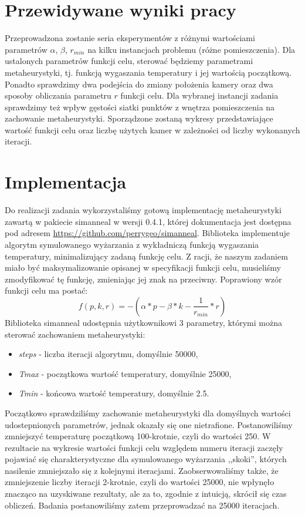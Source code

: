 \documentclass[12pt,a4paper]{article}
\begin{document}
\section{Przewidywane wyniki pracy}
Przeprowadzona zostanie seria eksperymentów z różnymi wartościami parametrów $\alpha$, $\beta$, $r_{min}$ na kilku instancjach problemu (różne pomieszczenia). Dla ustalonych parametrów funkcji celu, sterować będziemy parametrami metaheurystyki, tj. funkcją wygaszania temperatury i jej
wartością początkową. Ponadto sprawdzimy dwa podejścia do zmiany położenia kamery oraz dwa sposoby obliczania parametru $r$ funkcji celu. Dla wybranej
instancji zadania sprawdzimy też wpływ gęstości siatki punktów z wnętrza
pomieszczenia na zachowanie metaheurystyki. Sporządzone zostaną wykresy przedstawiające wartość funkcji celu oraz liczbę użytych kamer w zależności od liczby wykonanych iteracji. 

\section{Implementacja}
Do realizacji zadania wykorzystaliśmy gotową implementację metaheurystyki zawartą w pakiecie simanneal w wersji 0.4.1,
której dokumentacja jest dostępna pod adresem \url{https://github.com/perrygeo/simanneal}.
Biblioteka implementuje algorytm symulowanego wyżarzania z wykładniczą funkcją wygaszania temperatury, minimalizujący zadaną
funkcję celu. Z racji, że naszym zadaniem miało być maksymalizowanie opisanej w specyfikacji funkcji celu, musieliśmy zmodyfikować tę
funkcję, zmieniając jej znak na przeciwny. Poprawiony wzór funkcji celu ma postać:
$$f(p, k, r) = - (\alpha * p - \beta * k - \frac{1}{r_{min}} * r) $$ 
Biblioteka simanneal udostępnia użytkownikowi 3 parametry, którymi można sterować zachowaniem metaheurystyki:
\begin{itemize}
\item \emph{steps} - liczba iteracji algorytmu, domyślnie 50000,
\item \emph{Tmax} - początkowa wartość temperatury, domyślnie 25000,
\item \emph{Tmin} - końcowa wartość temperatury, domyślnie 2.5.
\end{itemize}
Początkowo sprawdziliśmy zachowanie metaheurystyki dla domyślnych wartości udostepnionych parametrów, jednak
okazały się one nietrafione. 
Postanowiliśmy zmniejszyć temperaturę początkową 100-krotnie, czyli do wartości 250.
W rezultacie na wykresie wartości funkcji celu względem numeru iteracji zaczęły pojawiać się charakterystyczne 
dla symulowanego wyżarzania ,,skoki'', których nasilenie zmniejszało się z kolejnymi iteracjami. 
Zaobserwowaliśmy także, że zmniejszenie liczby iteracji 2-krotnie, czyli do wartości 25000, 
nie wpłynęło znacząco na uzyskiwane rezultaty, ale za to, zgodnie z intuicją, skrócił się czas obliczeń.
Badania postanowiliśmy zatem przeprowadzać na 25000 iteracjach.
\end{document}
